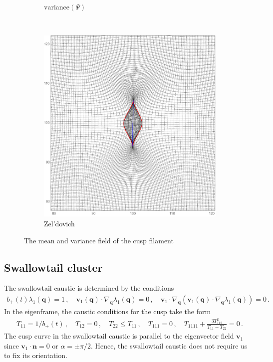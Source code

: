 \documentclass[a4paper, 11pt]{article}
\begin{document}
\begin{figure}
\begin{subfigure}[b]{0.32\textwidth}
\caption{$\text{variance}(\Psi)$}
\end{subfigure}~
\begin{subfigure}[b]{0.32\textwidth}
\includegraphics[width=\textwidth]{Cusp_E_Mean}
\caption{Zel'dovich}
\end{subfigure}
\caption{The mean and variance field of the cusp filament}\label{fig:meanCusp}
\end{figure}





\subsection{Swallowtail cluster}
The swallowtail caustic is determined by the conditions
\begin{align}
b_+(t) \lambda_1(\bm{q}) = 1\,, \quad \bm{v}_1(\bm{q}) \cdot \nabla_{\bm{q}}\lambda_1(\bm{q}) = 0\,, \quad\bm{v}_1\cdot \nabla_{\bm{q}}( \bm{v}_1(\bm{q}) \cdot \nabla_{\bm{q}}\lambda_1(\bm{q})) = 0\,.
\end{align}
In the eigenframe, the caustic conditions for the cusp take the form
\begin{align}
T_{11}=1/b_+(t)\,, \quad T_{12}=0\,,\quad T_{22}\leq T_{11}\,,\quad T_{111}=0\,, \quad T_{1111}+\frac{3T_{112}^2}{T_{11}-T_{22}} =0\,.
\end{align}
The cusp curve in the swallowtail caustic is parallel to the eigenvector field $\bm{v}_1$ since $\bm{v}_1 \cdot \bm{n}=0$ or $\alpha = \pm \pi/2$. Hence, the swallowtail caustic does not require us to fix its orientation.
\end{document}
